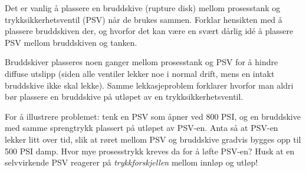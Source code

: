 

Det er vanlig å plassere en bruddskive (rupture disk) mellom prosesstank og trykksikkerhetsventil (PSV) når de brukes sammen.  Forklar hensikten med å plassere bruddskiven der, og hvorfor det kan være en svært dårlig idé å plassere PSV mellom bruddskiven og tanken.







Bruddskiver plasseres noen ganger mellom prosesstank og PSV for å hindre diffuse utslipp (siden alle ventiler lekker noe i normal drift, mens en intakt bruddskive ikke skal lekke).  Samme lekkasjeproblem forklarer hvorfor man aldri bør plassere en bruddskive på utløpet av en trykksikkerhetsventil.

\vskip 10pt

For å illustrere problemet: tenk en PSV som åpner ved 800 PSI, og en bruddskive med samme sprengtrykk plassert på utløpet av PSV-en.  Anta så at PSV-en lekker litt over tid, slik at røret mellom PSV og bruddskive gradvis bygges opp til 500 PSI damp.  Hvor mye prosesstrykk kreves da for å løfte PSV-en?  Husk at en selvvirkende PSV reagerer på \textit{trykkforskjellen} mellom innløp og utløp!










